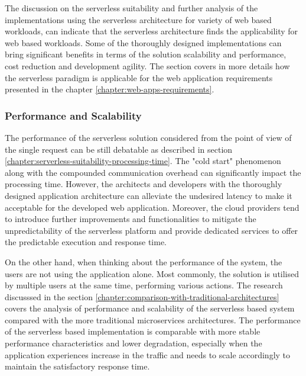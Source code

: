 The discussion on the serverless suitability and further analysis of the implementations using the serverless architecture for variety of web based workloads, can indicate that the serverless architecture finds the applicability for web based workloads. 
Some of the thoroughly designed implementations can bring significant benefits in terms of the solution scalability and performance, cost reduction and development agility.
The section covers in more details how the serverless paradigm is applicable for the web application requirements presented in the chapter \ref{chapter:web-apps-requirements}.



\subsubsection{Performance and Scalability}

The performance of the serverless solution considered from the point of view of the single request can be still debatable as described in section \ref{chapter:serverless-suitability-processing-time}. 
The "cold start" phenomenon along with the compounded communication overhead can significantly impact the processing time. 
However, the architects and developers with the thoroughly designed application architecture can alleviate the undesired latency to make it acceptable for the developed web application.
Moreover, the cloud providers tend to introduce further improvements and functionalities to mitigate the unpredictability of the serverless platform and provide dedicated services to offer the predictable execution and response time.

On the other hand, when thinking about the performance of the system, the users are not using the application alone. 
Most commonly, the solution is utilised by multiple users at the same time, performing various actions. 
The research discusssed in the section \ref{chapter:comparison-with-traditional-architectures} covers the analysis of performance and scalability of the serverless based system compared with the more traditional microservices architectures. 
The performance of the serverless based implementation is comparable with more stable performance characteristics and lower degradation, especially when the application experiences increase in the traffic and needs to scale accordingly to maintain the satisfactory response time.

